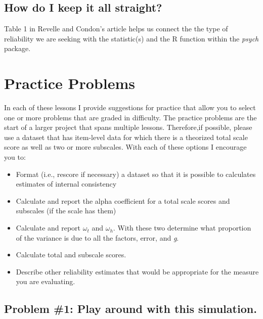 \documentclass[
  english,
]{book}
\providecommand{\tightlist}{%
  \setlength{\itemsep}{0pt}\setlength{\parskip}{0pt}}
\begin{document}
\hypertarget{how-do-i-keep-it-all-straight}{%
\subsection{How do I keep it all straight?}\label{how-do-i-keep-it-all-straight}}

Table 1 in Revelle and Condon's \citep{revelle_reliability_2019} article helps us connect the the type of reliability we are seeking with the statistic(s) and the R function within the \emph{psych} package.

\hypertarget{practice-problems-3}{%
\section{Practice Problems}\label{practice-problems-3}}

In each of these lessons I provide suggestions for practice that allow you to select one or more problems that are graded in difficulty. The practice problems are the start of a larger project that spans multiple lessons. Therefore,if possible, please use a dataset that has item-level data for which there is a theorized total scale score as well as two or more subscales. With each of these options I encourage you to:

\begin{itemize}
\tightlist
\item
  Format (i.e., rescore if necessary) a dataset so that it is possible to calculates estimates of internal consistency
\item
  Calculate and report the alpha coefficient for a total scale scores and subscales (if the scale has them)
\item
  Calculate and report \(\omega_{t}\) and \(\omega_{h}\). With these two determine what proportion of the variance is due to all the factors, error, and \emph{g}.
\item
  Calculate total and subscale scores.
\item
  Describe other reliability estimates that would be appropriate for the measure you are evaluating.
\end{itemize}

\hypertarget{problem-1-play-around-with-this-simulation.-1}{%
\subsection{Problem \#1: Play around with this simulation.}\label{problem-1-play-around-with-this-simulation.-1}}
\end{document}
